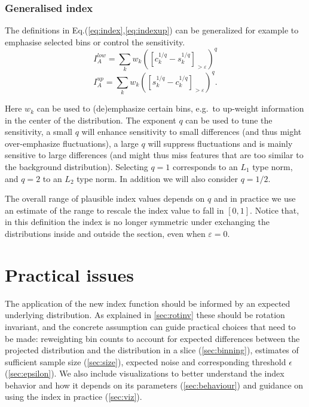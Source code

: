 \documentclass[]{interact}
\theoremstyle{plain}%
\theoremstyle{definition}
\theoremstyle{remark}
\begin{document}
\hypertarget{sec:generalise}{%
\subsubsection*{Generalised index}\label{sec:generalise}}

The definitions in Eq.(\ref{eq:index},\ref{eq:indexup}) can be
generalized for example to emphasise selected bins or control the
sensitivity. \begin{equation}
I_A^{low} = \sum_{k}w_{k}\left(\left[c_{k}^{1/q}-s_{k}^{1/q}\right]_{>\varepsilon}\right)^{q}
\label{eq:index2}
\end{equation} \begin{equation}
I_A^{up} = \sum_{k}w_{k}\left(\left[s_{k}^{1/q}-c_{k}^{1/q}\right]_{>\varepsilon}\right)^{q}.
\label{eq:index2up}
\end{equation}

Here \(w_k\) can be used to (de)emphasize certain bins, e.g.~to
up-weight information in the center of the distribution. The exponent
\(q\) can be used to tune the sensitivity, a small \(q\) will enhance
sensitivity to small differences (and thus might over-emphasize
fluctuations), a large \(q\) will suppress fluctuations and is mainly
sensitive to large differences (and might thus miss features that are
too similar to the background distribution). Selecting \(q=1\)
corresponds to an \(L_1\) type norm, and \(q=2\) to an \(L_2\) type
norm. In addition we will also consider \(q=1/2\).

The overall range of plausible index values depends on \(q\) and in
practice we use an estimate of the range to rescale the index value to
fall in \([0,1]\). Notice that, in this definition the index is no
longer symmetric under exchanging the distributions inside and outside
the section, even when \(\varepsilon=0\).

\hypertarget{practical-issues}{%
\section{\texorpdfstring{Practical issues
\label{sec:practical}}{Practical issues }}\label{practical-issues}}

The application of the new index function should be informed by an
expected underlying distribution. As explained in \ref{sec:rotinv} these
should be rotation invariant, and the concrete assumption can guide
practical choices that need to be made: reweighting bin counts to
account for expected differences between the projected distribution and
the distribution in a slice (\ref{sec:binning}), estimates of sufficient
sample size (\ref{sec:size}), expected noise and corresponding threshold
\(\epsilon\) (\ref{sec:epsilon}). We also include visualizations to
better understand the index behavior and how it depends on its
parameters (\ref{sec:behaviour}) and guidance on using the index in
practice (\ref{sec:viz}).
\end{document}
